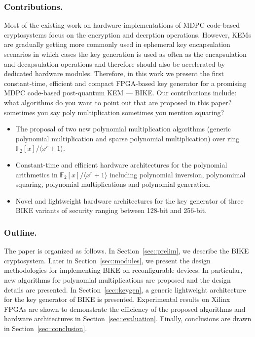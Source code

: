 \documentclass[runningheads]{llncs}
\begin{document}
\subsubsection{Contributions.} Most of the existing work on hardware implementations of MDPC code-based 
cryptosystems focus on the encryption and decrption operations. 
However, KEMs are gradually getting more commonly used in ephemeral
key encapsulation scenarios in which cases the key
generation is used as often as the encapsulation and decapsulation operations
and therefore should also be accelerated by dedicated hardware modules.
Therefore, in this work we present the first constant-time, efficient and compact 
FPGA-based key generator for a promising MDPC code-based post-quantum KEM \mbox{---} BIKE. 
Our contributions include:
{\color{red} what algorithms do you want to point out that are proposed in this paper?
  sometimes you say poly multiplication sometimes you mention squaring?}
\begin{itemize}
  \item The proposal of two new polynomial multiplication algorithms (generic polynomial multiplication and sparse polynomial multiplication) over ring $\mathbb{F}_2[x]/\langle x^r+1\rangle$.
  \item Constant-time and efficient hardware architectures for the polynomial arithmetics
  in $\mathbb{F}_2[x]/\langle x^r+1\rangle$ including polynomial inversion, polynomimal squaring, polynomial multiplications and 
  polynomial generation.  
  \item Novel and lightweight hardware architectures for the key generator of three BIKE variants of security ranging 
  between 128-bit and 256-bit.
\end{itemize}

\subsubsection{Outline.} 
The paper is organized as follows. 
In Section~\ref{sec::prelim}, we describe the BIKE cryptosystem. 
Later in Section~\ref{sec::modules}, we present the design methodologies 
for implementing BIKE on reconfigurable devices. 
In particular, new algorithms for 
polynomial multiplications are proposed and
the design details are presented. 
In Section~\ref{sec::keygen}, a generic lightweight architecture for the key generator of BIKE 
is presented. 
Experimental results on Xilinx FPGAs are shown to demonstrate the 
efficiency of the proposed algorithms and hardware architectures
in Section~\ref{sec::evaluation}. 
Finally, conclusions are drawn in Section~\ref{sec::conclusion}.
\end{document}
